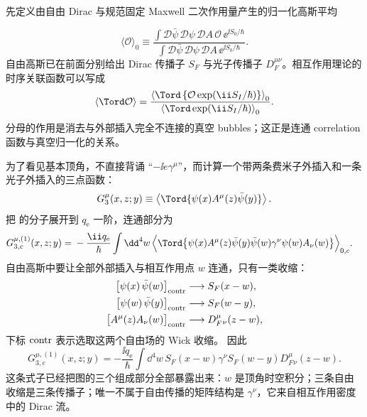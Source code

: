 \begin{derivation}[高斯平均中的传播子与顶角规则]
先定义由自由 Dirac 与规范固定 Maxwell 二次作用量产生的归一化高斯平均

\begin{equation*}
 \langle\mathcal O\rangle_0
 \equiv
 \frac{\displaystyle
 \int\mathcal D\bar\psi\,\mathcal D\psi\,\mathcal DA\,
 \mathcal O\,\ee^{\ii S_0/\hbar}}
 {\displaystyle
 \int\mathcal D\bar\psi\,\mathcal D\psi\,\mathcal DA\,
 \ee^{\ii S_0/\hbar}}.
 \end{equation*}
自由高斯已在前面分别给出 Dirac 传播子 $S_F$ 与光子传播子 $D_F^{\mu\nu}$。相互作用理论的时序关联函数可以写成
\begin{equation*}
 {
 \langle\Tord\mathcal O\rangle
 =\frac{
 \left\langle\Tord\left\{\mathcal O
 \exp\!\left(\ii S_I/\hbar\right)\right\}\right\rangle_0}
 {\left\langle\Tord\exp\!\left(\ii S_I/\hbar\right)\right\rangle_0}.}
 \end{equation*}
分母的作用是消去与外部插入完全不连接的真空 bubbles；这正是连通 correlation 函数与真空归一化的关系。

为了看见基本顶角，不直接背诵 ``$-\ii e\gamma^\mu$''，而计算一个带两条费米子外插入和一条光子外插入的三点函数：
\begin{equation*}
 G_3^\mu(x,z;y)
 \equiv
 \left\langle
 \Tord\{\psi(x)A^\mu(z)\bar\psi(y)\}
 \right\rangle .
 \end{equation*}
把 的分子展开到 $q_{\mathrm e}$ 一阶，连通部分为
\begin{align*}
 G_{3,c}^{\mu,(1)}(x,z;y)
 ={}&-\frac{\ii q_{\mathrm e}}{\hbar}
 \int\dd^4 w\,
 \Big\langle\Tord\big\{
 \psi(x)A^\mu(z)\bar\psi(y)
 \bar\psi(w)\gamma^\nu\psi(w)A_\nu(w)
 \big\}\Big\rangle_{0,c}.
 \end{align*}
自由高斯中要让全部外部插入与相互作用点 $w$ 连通，只有一类收缩：
\begin{align*}
 \bigl[\psi(x)\,\bar\psi(w)\bigr]_{\rm contr}&\longrightarrow S_F(x-w),\\
 \bigl[\psi(w)\,\bar\psi(y)\bigr]_{\rm contr}&\longrightarrow S_F(w-y),\\
 \bigl[A^\mu(z)A_\nu(w)\bigr]_{\rm contr}&\longrightarrow D_F^{\mu}{}_{\nu}(z-w),
\end{align*}
下标 $\rm contr$ 表示选取这两个自由场的 Wick 收缩。
因此
\begin{equation*}
 {
 G_{3,c}^{\mu,(1)}(x,z;y)
 =-\frac{\ii q_{\mathrm e}}{\hbar}
 \int\dd^4 w\,
 S_F(x-w)\gamma^\nu S_F(w-y)
 D_F^{\mu}{}_{\nu}(z-w).}
 \end{equation*}
这条式子已经把图的三个组成部分全部暴露出来：$w$ 是顶角时空积分；三条自由收缩是三条传播子；唯一不属于自由传播的矩阵结构是 $\gamma^\nu$，它来自相互作用密度中的 Dirac 流。


\end{derivation}
